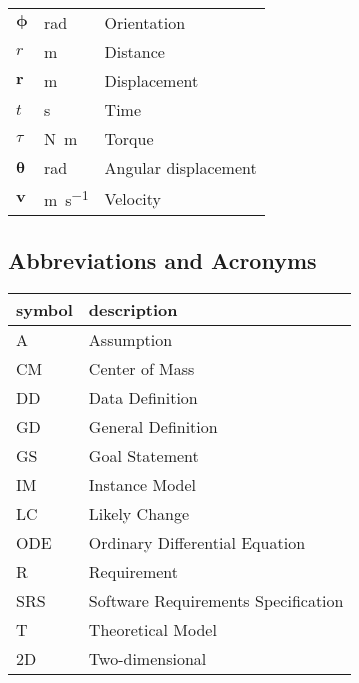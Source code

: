 \documentclass[12pt]{article}
\begin{document}
\begin{longtable}{l l p{12cm}}
  $\boldsymbol{\phi}$ & \si{\radian} & Orientation \\
  $r$ & \si{\metre} & Distance \\
  $\mathbf{r}$ & \si{\metre} & Displacement \\
  $t$ & \si{\second} & Time \\
  $\tau$ & \si{\newton\metre} & Torque \\
  $\boldsymbol{\theta}$ & \si{\radian} & Angular displacement \\
  $\mathbf{v}$ & \si{\metre\per\second} & Velocity \\
  \bottomrule
\end{longtable}

\subsection{Abbreviations and Acronyms}

\renewcommand{\arraystretch}{1.2}
\begin{tabular}{l l} 
  \toprule		
  \textbf{symbol} & \textbf{description}\\
  \midrule 
  A & Assumption\\
  CM & Center of Mass\\
  DD & Data Definition\\
  GD & General Definition\\
  GS & Goal Statement\\
  IM & Instance Model\\
  LC & Likely Change\\
  ODE & Ordinary Differential Equation\\
  R & Requirement\\
  SRS & Software Requirements Specification\\
  T & Theoretical Model\\
  2D & Two-dimensional \\
  \bottomrule
\end{tabular}\\


~\newpage
\end{document}
